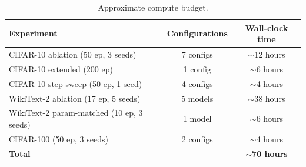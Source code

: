 \documentclass[10pt]{article}
\begin{document}
\begin{table}[h]
\centering
\caption{Approximate compute budget.}
\label{tab:compute_budget}
\small
\begin{tabular}{@{}lcc@{}}
\toprule
Experiment & Configurations & Wall-clock time \\
\midrule
CIFAR-10 ablation (50 ep, 3 seeds)     & 7 configs & $\sim$12 hours \\
CIFAR-10 extended (200 ep)              & 1 config  & $\sim$6 hours \\
CIFAR-10 step sweep (50 ep, 1 seed)    & 4 configs & $\sim$4 hours \\
WikiText-2 ablation (17 ep, 5 seeds)   & 5 models  & $\sim$38 hours \\
WikiText-2 param-matched (10 ep, 3 seeds) & 1 model & $\sim$6 hours \\
CIFAR-100 (50 ep, 3 seeds)            & 2 configs & $\sim$4 hours \\
\midrule
\textbf{Total} & & $\sim$\textbf{70 hours} \\
\bottomrule
\end{tabular}
\end{table}


\end{document}
